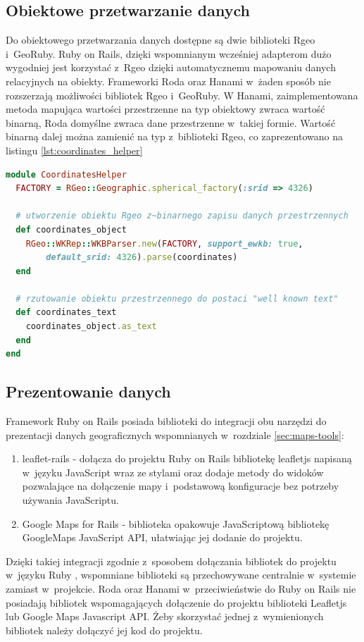 \documentclass[archivemode]{mgr}
\begin{document}
\subsection{Obiektowe przetwarzanie danych}

 Do obiektowego przetwarzania danych dostępne są dwie biblioteki Rgeo i~GeoRuby. Ruby on Rails, dzięki wspomnianym wcześniej adapterom dużo wygodniej jest korzystać z~Rgeo dzięki automatycznemu mapowaniu danych relacyjnych na obiekty.
 Frameworki Roda oraz Hanami w~żaden sposób nie rozszerzają możliwości bibliotek Rgeo i~GeoRuby. W  Hanami, zaimplementowana metoda mapująca wartości przestrzenne na typ obiektowy zwraca wartość binarną, Roda domyślne zwraca dane przestrzenne w~takiej formie. Wartość binarną dalej można zamienić na typ z~biblioteki Rgeo, co zaprezentowano na listingu \ref{lst:coordinates_helper}

 \begin{lstlisting}[language=Ruby, caption={Tworzenie obiektu Rgeo z~zapisu binarnego danych przestrzennych}, label=lst:coordinates_helper]
module CoordinatesHelper
  FACTORY = RGeo::Geographic.spherical_factory(:srid => 4326)

  # utworzenie obiektu Rgeo z~binarnego zapisu danych przestrzennych
  def coordinates_object
    RGeo::WKRep::WKBParser.new(FACTORY, support_ewkb: true,
        default_srid: 4326).parse(coordinates)
  end

  # rzutowanie obiektu przestrzennego do postaci "well known text"
  def coordinates_text
    coordinates_object.as_text
  end
end
\end{lstlisting}

\subsection{Prezentowanie danych}

Framework Ruby on Rails posiada biblioteki do integracji obu narzędzi do prezentacji danych geograficznych wspomnianych w~rozdziale \ref{sec:maps-tools}:
\begin{enumerate}
  \item{leaflet-rails} - dołącza do projektu Ruby on Rails bibliotekę leafletjs napisaną w~języku JavaScript wraz ze stylami oraz dodaje metody do widoków pozwalające na dołączenie mapy i~podstawową konfiguracje bez potrzeby używania JavaScriptu.
  \item{Google Maps for Rails} - biblioteka opakowuje JavaScriptową bibliotekę GoogleMaps JavaScript API, ułatwiając jej dodanie do projektu.
\end{enumerate}
Dzięki takiej integracji zgodnie z~sposobem dołączania bibliotek do projektu w~języku Ruby \cite{doc_ruby}, wspomniane biblioteki są przechowywane centralnie w~systemie zamiast w~projekcie.
Roda oraz Hanami w~przeciwieństwie do Ruby on Rails nie posiadają bibliotek wspomagających dołączenie do projektu biblioteki Leafletjs lub Google Maps Javascript API. Żeby skorzystać jednej z~wymienionych bibliotek należy dołączyć jej kod do projektu.
\end{document}
